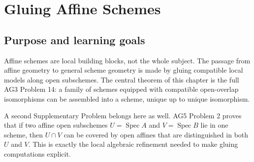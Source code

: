 
\chapter{Gluing Affine Schemes}
\label{ch:gluing-affine-schemes}
\providecommand{\OO}{\mathcal O}
\providecommand{\Spec}{\operatorname{Spec}}
\providecommand{\A}{\mathbb A}
\providecommand{\PP}{\mathbb P}
\providecommand{\mfp}{\mathfrak p}
\providecommand{\mfq}{\mathfrak q}
\providecommand{\ZZ}{\mathbb Z}

\section*{Purpose and learning goals}

Affine schemes are local building blocks, not the whole subject.  The passage from affine
geometry to general scheme geometry is made by gluing compatible local models along open
subschemes.  The central theorem of this chapter is the full AG3 Problem 14: a family
of schemes equipped with compatible open-overlap isomorphisms can be assembled into a scheme,
unique up to unique isomorphism.

A second Supplementary Problem belongs here as well.  AG5 Problem 2 proves that if two affine open
subschemes $U=\Spec A$ and $V=\Spec B$ lie in one scheme, then $U\cap V$ can be covered by
open affines that are distinguished in both $U$ and $V$.  This is exactly the local algebraic
refinement needed to make gluing computations explicit.

